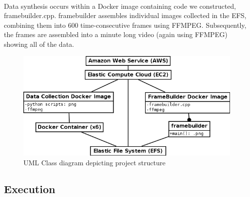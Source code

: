 \documentclass{article}
\begin{document}
  \paragraph{}
  Data synthesis occurs within a Docker image containing code we constructed, framebuilder.cpp. framebuilder assembles individual images collected in the EFS, combining them into 600 time-consecutive frames using FFMPEG. Subsequently, the frames are assembled into a minute long video (again using FFMPEG) showing all of the data.
  \begin{figure}[H]
    \centering
    \includegraphics[width=0.8\linewidth]{img/class_diagram.png}
    \caption{UML Class diagram depicting project structure}
    \label{class_diagram}
  \end{figure}

  \subsection{Execution}
\end{document}

